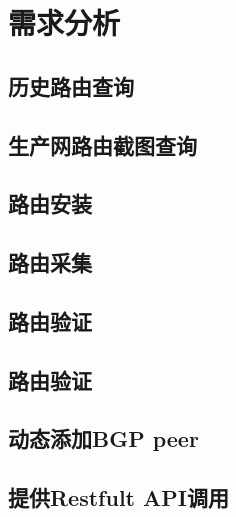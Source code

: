 
\chapter{需求分析}

\section{历史路由查询}

\section{生产网路由截图查询}

\section{路由安装}

\section{路由采集}

\section{路由验证}

\section{路由验证}

\section{动态添加BGP peer}

\section{提供Restfult API调用}

\subsection{}

\subsubsection{}

\paragraph{}

\subparagraph{}